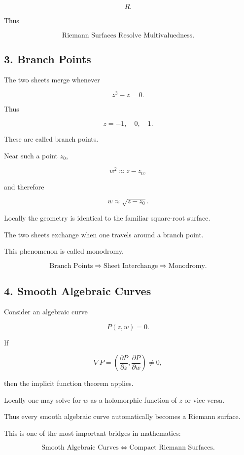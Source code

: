\documentclass[12pt,a4paper]{article}
\theoremstyle{notespace}
\begin{document}
\[
R.
\]

Thus

\[
\boxed{
	\text{Riemann Surfaces Resolve Multivaluedness.}
}
\]

\bigskip

\subsection{3. Branch Points}

The two sheets merge whenever

\[
z^3-z=0.
\]

Thus

\[
z=-1,\quad0,\quad1.
\]

These are called branch points.

Near such a point \(z_0\),

\[
w^2\approx z-z_0,
\]

and therefore

\[
w\approx \sqrt{z-z_0}.
\]

Locally the geometry is identical to the familiar square-root surface.

The two sheets exchange when one travels around a branch point.

This phenomenon is called monodromy.

\[
\boxed{
	\text{Branch Points}
	\Longrightarrow
	\text{Sheet Interchange}
	\Longrightarrow
	\text{Monodromy}.
}
\]

\bigskip

\subsection{4. Smooth Algebraic Curves}

Consider an algebraic curve

\[
P(z,w)=0.
\]

If

\[
\nabla P
=
\left(
\frac{\partial P}{\partial z},
\frac{\partial P}{\partial w}
\right)
\neq0,
\]

then the implicit function theorem applies.

Locally one may solve for \(w\) as a holomorphic function of \(z\) or vice versa.

Thus every smooth algebraic curve automatically becomes a Riemann surface.

This is one of the most important bridges in mathematics:

\[
\boxed{
	\text{Smooth Algebraic Curves}
	\Longleftrightarrow
	\text{Compact Riemann Surfaces}.
}
\]
\end{document}
